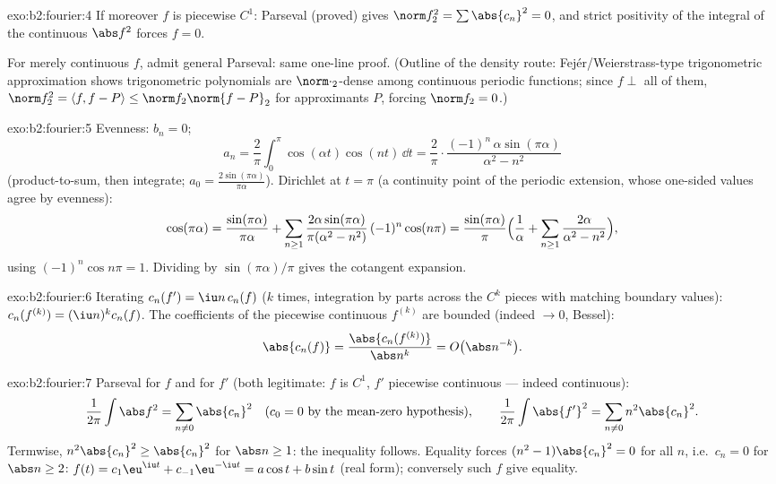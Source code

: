 \begin{solution}{exo:b2:fourier:4}
If moreover $f$ is piecewise $C^1$: Parseval (proved) gives
$\norm f_2^2 = \sum\abs{c_n}^2 = 0$, and strict positivity of the
integral of the continuous $\abs f^2$ forces $f = 0$.

For merely continuous $f$, admit general Parseval: same one-line
proof. (Outline of the density route: Fej\'er/Weierstrass-type
trigonometric approximation shows trigonometric polynomials are
$\norm\cdot_2$-dense among continuous periodic functions; since $f
\perp$ all of them, $\norm f_2^2 = \langle f, f - P\rangle \leq
\norm f_2\norm{f - P}_2$ for approximants $P$, forcing $\norm f_2 =
0$.)
\end{solution}

\begin{solution}{exo:b2:fourier:5}
Evenness: $b_n = 0$;
\[
a_n = \frac{2}{\pi}\int_0^\pi \cos(\alpha t)\cos(nt)\,\dd t
= \frac{2}{\pi}\cdot
\frac{(-1)^n\,\alpha\sin(\pi\alpha)}{\alpha^2 - n^2}
\]
(product-to-sum, then integrate; $a_0 =
\frac{2\sin(\pi\alpha)}{\pi\alpha}$). Dirichlet at $t = \pi$ (a
continuity point of the periodic extension, whose one-sided values
agree by evenness):
\[
\cos(\pi\alpha)
= \frac{\sin(\pi\alpha)}{\pi\alpha}
+ \sum_{n\geq1} \frac{2\alpha\sin(\pi\alpha)}{\pi(\alpha^2 -
n^2)}\,(-1)^n\cos(n\pi)
= \frac{\sin(\pi\alpha)}{\pi}\Bigl(\frac{1}{\alpha} +
\sum_{n\geq1}\frac{2\alpha}{\alpha^2 - n^2}\Bigr),
\]
using $(-1)^n\cos n\pi = 1$. Dividing by $\sin(\pi\alpha)/\pi$
gives the cotangent expansion.
\end{solution}

\begin{solution}{exo:b2:fourier:6}
Iterating $c_n(f') = \iu n\,c_n(f)$ ($k$ times, integration by
parts across the $C^{k}$ pieces with matching boundary values):
$c_n(f^{(k)}) = (\iu n)^k c_n(f)$. The coefficients of the
piecewise continuous $f^{(k)}$ are bounded (indeed $\to 0$, Bessel):
\[
\abs{c_n(f)} = \frac{\abs{c_n(f^{(k)})}}{\abs n^k}
= O\bigl(\abs n^{-k}\bigr) .
\]
\end{solution}

\begin{solution}{exo:b2:fourier:7}
Parseval for $f$ and for $f'$ (both legitimate: $f$ is $C^1$, $f'$
piecewise continuous --- indeed continuous):
\[
\frac{1}{2\pi}\int \abs f^2 = \sum_{n\neq0} \abs{c_n}^2
\quad (c_0 = 0 \text{ by the mean-zero hypothesis}),
\qquad
\frac{1}{2\pi}\int \abs{f'}^2 = \sum_{n\neq0} n^2\abs{c_n}^2 .
\]
Termwise, $n^2\abs{c_n}^2 \geq \abs{c_n}^2$ for $\abs n \geq 1$:
the inequality follows. Equality forces $(n^2 - 1)\abs{c_n}^2 = 0$
for all $n$, i.e.\ $c_n = 0$ for $\abs n \geq 2$: $f(t) =
c_1\eu^{\iu t} + c_{-1}\eu^{-\iu t} = a\cos t + b\sin t$ (real
form); conversely such $f$ give equality.
\end{solution}

